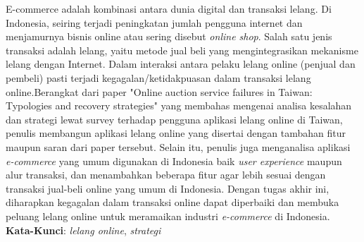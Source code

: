 \begin{abstrak}
		E-commerce adalah kombinasi antara dunia digital dan transaksi lelang. Di Indonesia, seiring terjadi peningkatan jumlah pengguna internet dan menjamurnya bisnis online atau sering disebut \textit{online shop}. Salah satu jenis transaksi adalah lelang, yaitu metode jual beli yang mengintegrasikan mekanisme lelang dengan Internet.
	    \newline
	    \indent Dalam interaksi antara pelaku lelang online (penjual dan pembeli) pasti terjadi kegagalan/ketidakpuasan dalam transaksi lelang online.Berangkat dari paper "Online auction service failures in   {Taiwan}: {Typologies} and recovery strategies" yang membahas mengenai analisa kesalahan dan strategi lewat survey terhadap pengguna aplikasi lelang online di Taiwan, penulis membangun aplikasi lelang online yang disertai dengan tambahan fitur maupun saran dari paper tersebut.
	    \newline 
	    \indent Selain itu, penulis juga menganalisa aplikasi \textit{e-commerce} yang umum digunakan di Indonesia baik \textit{user experience} maupun alur transaksi, dan menambahkan beberapa fitur agar lebih sesuai dengan transaksi jual-beli online yang umum di Indonesia. Dengan tugas akhir ini, diharapkan kegagalan dalam transaksi online dapat diperbaiki dan membuka peluang lelang online untuk meramaikan industri \textit{e-commerce} di Indonesia.\\
\noindent \textbf{Kata-Kunci}: \textit{lelang online}, \textit{strategi }
\end{abstrak}
